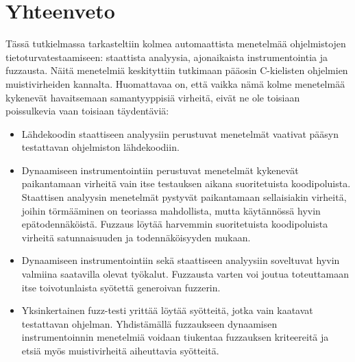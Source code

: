 \section{Yhteenveto}
Tässä tutkielmassa tarkasteltiin kolmea automaattista menetelmää ohjelmistojen tietoturvatestaamiseen:
staattista analyysia, ajonaikaista instrumentointia ja fuzzausta.
Näitä menetelmiä keskityttiin tutkimaan pääosin C-kielisten ohjelmien muistivirheiden kannalta.
Huomattavaa on, että vaikka nämä kolme menetelmää kykenevät havaitsemaan samantyyppisiä virheitä,
eivät ne ole toisiaan poissulkevia vaan toisiaan täydentäviä:
\begin{itemize}
    \item Lähdekoodin staattiseen analyysiin perustuvat menetelmät vaativat pääsyn
          testattavan ohjelmiston lähdekoodiin.
    \item Dynaamiseen instrumentointiin perustuvat menetelmät kykenevät paikantamaan virheitä
          vain itse testauksen aikana suoritetuista koodipoluista.
          Staattisen analyysin menetelmät pystyvät paikantamaan sellaisiakin virheitä,
          joihin törmääminen on teoriassa mahdollista, mutta käytännössä hyvin epätodennäköistä.
          Fuzzaus löytää harvemmin suoritetuista koodipoluista virheitä satunnaisuuden ja todennäköisyyden mukaan.
    \item Dynaamiseen instrumentointiin sekä staattiseen analyysiin soveltuvat hyvin valmiina saatavilla olevat työkalut.
          Fuzzausta varten voi joutua toteuttamaan itse toivotunlaista syötettä generoivan fuzzerin.
    \item Yksinkertainen fuzz-testi yrittää löytää syötteitä, jotka vain kaatavat testattavan ohjelman.
          Yhdistämällä fuzzaukseen dynaamisen instrumentoinnin menetelmiä voidaan
          tiukentaa fuzzauksen kriteereitä ja etsiä myös muistivirheitä aiheuttavia syötteitä.
\end{itemize}
